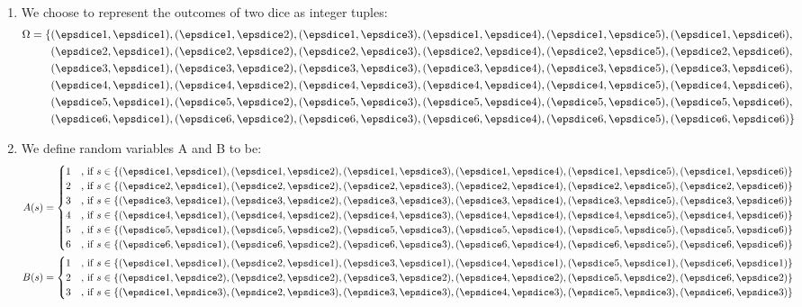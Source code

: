 \paragraph{}
\begin{enumerate}[label=\alph*.]
\item
We choose to represent the outcomes of two dice as integer tuples:
\begin{align*}
\Omega = \{
&(\dA,\dA), (\dA,\dB), (\dA,\dC), (\dA,\dD), (\dA,\dE), (\dA,\dF),  \\
&(\dB,\dA), (\dB,\dB), (\dB,\dC), (\dB,\dD), (\dB,\dE), (\dB,\dF),  \\
&(\dC,\dA), (\dC,\dB), (\dC,\dC), (\dC,\dD), (\dC,\dE), (\dC,\dF),  \\
&(\dD,\dA), (\dD,\dB), (\dD,\dC), (\dD,\dD), (\dD,\dE), (\dD,\dF),  \\
&(\dE,\dA), (\dE,\dB), (\dE,\dC), (\dE,\dD), (\dE,\dE), (\dE,\dF),  \\
&(\dF,\dA), (\dF,\dB), (\dF,\dC), (\dF,\dD), (\dF,\dE), (\dF,\dF) \}
\end{align*}
\item
We define random variables A and B to be:
\begin{align*}
A(s) =
\begin{cases}
1 &\text{, if } s \in \{ (\dA, \dA), (\dA,\dB), (\dA,\dC), (\dA,\dD), (\dA,\dE), (\dA,\dF) \} \\
2 &\text{, if } s \in \{ (\dB, \dA), (\dB,\dB), (\dB,\dC), (\dB,\dD), (\dB,\dE), (\dB,\dF) \} \\
3 &\text{, if } s \in \{ (\dC, \dA), (\dC,\dB), (\dC,\dC), (\dC,\dD), (\dC,\dE), (\dC,\dF) \} \\
4 &\text{, if } s \in \{ (\dD, \dA), (\dD,\dB), (\dD,\dC), (\dD,\dD), (\dD,\dE), (\dD,\dF) \} \\
5 &\text{, if } s \in \{ (\dE, \dA), (\dE,\dB), (\dE,\dC), (\dE,\dD), (\dE,\dE), (\dE,\dF) \} \\
6 &\text{, if } s \in \{ (\dF, \dA), (\dF,\dB), (\dF,\dC), (\dF,\dD), (\dF,\dE), (\dF,\dF) \}
\end{cases} \\
B(s) =
\begin{cases}
1 &\text{, if } s \in \{ (\dA,\dA), (\dB,\dA), (\dC,\dA), (\dD,\dA), (\dE,\dA), (\dF,\dA) \} \\
2 &\text{, if } s \in \{ (\dA,\dB), (\dB,\dB), (\dC,\dB), (\dD,\dB), (\dE,\dB), (\dF,\dB) \} \\
3 &\text{, if } s \in \{ (\dA,\dC), (\dB,\dC), (\dC,\dC), (\dD,\dC), (\dE,\dC), (\dF,\dC) \} \\

\end{cases}
\end{align*}
\end{enumerate}

